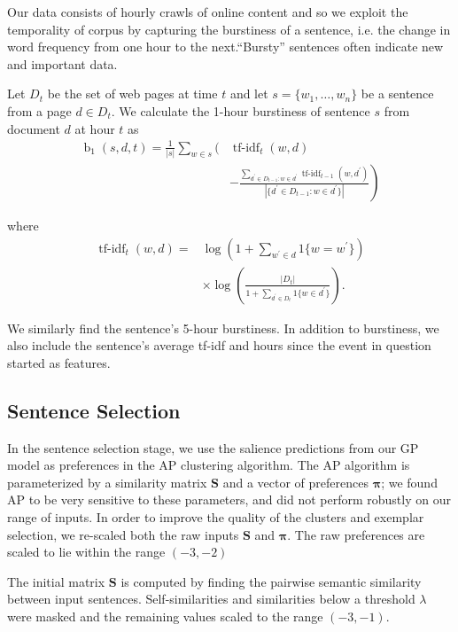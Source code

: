 \documentclass[10pt]{article} \usepackage{url} \usepackage{color}
\begin{document}
Our data consists of hourly crawls of online content and so we exploit the
temporality of corpus by capturing the burstiness of a sentence, i.e.  the
change in word frequency from one hour to the next.``Bursty'' sentences often
indicate new and important data. 

Let $D_t$ be the set of web pages at time $t$ and let $s = \{w_1,\ldots,
w_n\}$ be a sentence from a page $d \in D_t$.  We calculate the 1-hour
burstiness of sentence $s$ from document $d$ at hour $t$  as \begin{align*}
\operatorname{b}_1(s,d,t) = \frac{1}{|s|} \sum_{w \in s} \Bigg( &
\operatorname{tf-idf}_t(w,d)  \\ & \left. - \frac{\sum_{d^\prime \in D_{t-1}:
w \in d^\prime } \operatorname{tf-idf}_{t-1}(w,d^\prime)}{|\{d^\prime \in
D_{t-1}: w \in d^\prime\}|} \right) \end{align*}

where \begin{align*} \operatorname{tf-idf}_t(w,d) =&
\log\left(1+\sum_{w^\prime \in d}1\{w=w^\prime\}  \right)\\ & \times
\log\left(\frac{|D_t|}{1 + \sum_{d^\prime \in D_t}1\{w \in d^\prime\}}\right).
\end{align*}


We similarly find the sentence's 5-hour burstiness.  In addition to
burstiness, we also include the sentence's average tf-idf and hours since the
event in question started as features.


\subsection{Sentence Selection}\label{subsec:SentenceSelection}

In the sentence selection stage, we use the salience predictions from our GP
model as preferences in the AP clustering algorithm. The AP algorithm is 
parameterized by a similarity matrix $\mathbf{S}$ and a vector of 
preferences $\boldsymbol{\pi}$; we found AP to be very sensitive to these
parameters, and did not perform robustly on our range of inputs.
In order to improve the quality of the clusters and exemplar selection,
we re-scaled both the raw inputs $\mathbf{S}$ and $\boldsymbol{\pi}$. 
The raw preferences are scaled to lie within the  range $(-3, -2)$

The initial matrix $\mathbf{S}$ is computed by finding the pairwise semantic
similarity between input sentences. Self-similarities and similarities below 
a threshold $\lambda$ were masked and the remaining values scaled to the range
$(-3, -1)$.
\end{document}
